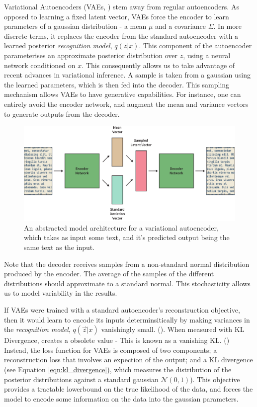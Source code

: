\documentclass[12pt,twoside]{report}
\begin{document}
Variational Autoencoders (VAEs, \cite{kingma_auto-encoding_2013}) stem away from regular autoencoders. As opposed to learning a fixed latent vector, VAEs force the encoder to learn parameters of a gaussian distribution - a mean $\mu$ and a covariance $\Sigma$. In more discrete terms, it replaces the encoder from the standard autoencoder with a learned posterior \textit{recognition model}, $q(z|x)$. This component of the autoencoder parameterises an approximate posterior distribution over $z$, using a neural network conditioned on $x$. This consequently allows us to take advantage of recent advances in variational inference.  A sample is taken from a gaussian using the learned parameters, which is then fed into the decoder. This sampling mechanism allows VAEs to have generative capabilities. For instance, one can entirely avoid the encoder network, and augment the mean and variance vectors to generate outputs from the decoder.

\begin{figure}[!ht]
	\centering
	\includegraphics[width=150mm]{diagrams/variational_autoencoders.pdf}
	\caption{An abstracted model architecture for a variational autoencoder, which takes as input some text, and it's predicted output being the same text as the input.\label{vae}}
  \end{figure}

Note that the decoder receives samples from a non-standard normal distribution produced by the encoder. The average of the samples of the different distributions should approximate to a standard normal. This stochasticity allows us to model variability in the results. 

If VAEs were trained with a standard autoencoder's reconstruction objective, then it would learn to encode its inputs determinsitically by making variances in the \textit{recognition model}, $q(\overrightarrow{z}|x)$ vanishingly small. (\cite{raiko_techniques_2014}). When measured with KL Divergence, creates a obsolete value - This is known as a vanishing KL. (\cite{fu*_cyclical_2019}) Instead, the loss function for VAEs is composed of two components; a reconstruction loss that involves an expection of the output; and a KL divergence (see Equation \ref{eqn:kl_divergence}), which measures the distribution of the posterior distributions against a standard gaussian $ \mathcal{N}(0,1)$). This objective provides a tractable lowerbound on the true likelihood of the data, and forces the model to encode some information on the data into the gaussian parameters.
  
\end{document}
